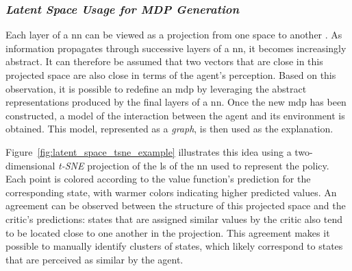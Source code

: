 

\subsubsection{\textit{Latent Space Usage for MDP Generation}}
\label{subsubsec:latent_space_mdp_generation}

Each layer of a \gls{nn} can be viewed as a projection from one space to another \parencite{zahavy2017graying}.
As information propagates through successive layers of a \gls{nn}, it becomes increasingly abstract.
It can therefore be assumed that two vectors that are close in this projected space are also close in terms of the agent's perception.
Based on this observation, it is possible to redefine an \gls{mdp} by leveraging the abstract representations produced by the final layers of a \gls{nn}.
Once the new \gls{mdp} has been constructed, a model of the interaction between the agent and its environment is obtained.
This model, represented as a \textit{graph}, is then used as the explanation.

Figure~\ref{fig:latent_space_tsne_example} illustrates this idea using a two-dimensional \textit{t-SNE} projection of the \gls{ls} of the \gls{nn} used to represent the policy.
Each point is colored according to the value function's prediction for the corresponding state, with warmer colors indicating higher predicted values.
An agreement can be observed between the structure of this projected space and the critic's predictions: states that are assigned similar values by the critic also tend to be located close to one another in the projection.
This agreement makes it possible to manually identify clusters of states, which likely correspond to states that are perceived as similar by the agent.


